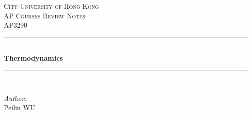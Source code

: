 \documentclass[UTF8]{book}
\date{\today}
\begin{document}
%
\frontmatter

\begin{titlepage}
\newcommand{\HRule}{\rule{\linewidth}{0.5mm}} %

\center %


\textsc{\LARGE City University of Hong Kong}\\[1.5cm] %
\textsc{\Large AP Courses Review Notes}\\[0.5cm] 		%
\textsc{\large {AP3290}}\\[0.5cm] 						%


\HRule \\[0.4cm]
{ \huge \bfseries  \textsf{Thermodynamics} }\\[0.4cm] %
\HRule \\[1.5cm]


\begin{minipage}{0.4\textwidth}
\begin{flushleft} \large
\emph{Author:}\\
Peilin \textsc{WU} %
\end{flushleft}
\end{minipage}\\[3cm] %
~


\end{titlepage}
\end{document}
